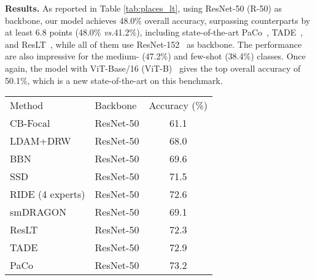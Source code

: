 \documentclass[runningheads]{llncs}
\def\vs{\emph{vs.}}
\newlength\savedwidth
\newcommand\whline{\noalign{\global\savedwidth\arrayrulewidth\global\arrayrulewidth 0.8pt}\hline\noalign{\global\arrayrulewidth\savedwidth}}
\begin{document}
\noindent\textbf{Results.} As reported in Table \ref{tab:places_lt}, using ResNet-50 (R-50) as backbone, our model achieves 48.0\% overall accuracy, surpassing counterparts by at least 6.8 points (48.0\% \vs 41.2\%), including state-of-the-art PaCo~\cite{cui2021parametric}, TADE~\cite{zhang2021test}, and ResLT~\cite{cui2021reslt}, while all of them use ResNet-152~\cite{he2016deep} as backbone. The performance are also impressive for the medium- (47.2\%) and few-shot (38.4\%) classes.
Once again, the model with ViT-Base/16 (ViT-B)~\cite{dosovitskiy2020image} gives the top overall accuracy of 50.1\%, which is a new state-of-the-art on this benchmark.

\begin{table}[t]
    \centering
\setlength{\tabcolsep}{3.0mm}
    \begin{tabular}{l|l|c}
\renewcommand{\arraystretch}{0.1}
Method & Backbone  & Accuracy (\%)  \\
	\whline
	CB-Focal \cite{cao2019learning} & ResNet-50 & 61.1 \\
	LDAM+DRW \cite{cao2019learning} & ResNet-50 & 68.0 \\
	BBN \cite{zhou2020bbn} & ResNet-50 & 69.6 \\
	SSD \cite{li2021self} & ResNet-50 & 71.5 \\
	RIDE (4 experts) \cite{wang2020long} & ResNet-50 & 72.6 \\
	smDRAGON~\cite{samuel2021generalized} & ResNet-50 & 69.1 \\
	ResLT~\cite{cui2021reslt} & ResNet-50 & 72.3 \\
	TADE \cite{zhang2021test} & ResNet-50 & 72.9 \\
	PaCo \cite{cui2021parametric} & ResNet-50 & 73.2 \\
	

\end{tabular}
\end{table}
\end{document}
